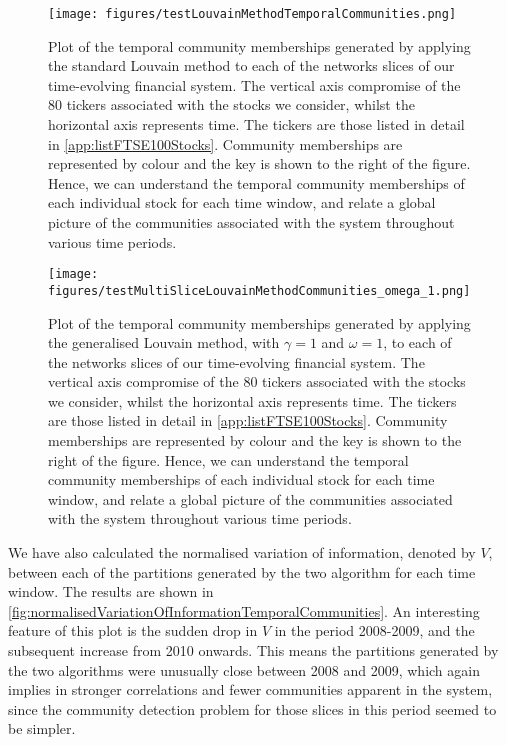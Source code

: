 \begin{figure}
	\centering
	\texttt{[image: figures/testLouvainMethodTemporalCommunities.png]}
	\caption[Plot of the temporal community memberships generated by applying the standard Louvain method to each of the networks slices of our time-evolving financial system.]{\label{fig:standardLouvainMethodTemporalCommunities} Plot of the temporal community memberships generated by applying the standard Louvain method to each of the networks slices of our time-evolving financial system. The vertical axis compromise of the 80 tickers associated with the stocks we consider, whilst the horizontal axis represents time. The tickers are those listed in detail in \cref{app:listFTSE100Stocks}. Community memberships are represented by colour and the key is shown to the right of the figure. Hence, we can understand the temporal community memberships of each individual stock for each time window, and relate a global picture of the communities associated with the system throughout various time periods.}
\end{figure}

\begin{figure}
	\centering
	\texttt{[image: figures/testMultiSliceLouvainMethodCommunities\_omega\_1.png]}
	\caption[Plot of the temporal community memberships generated by applying the generalised Louvain method to each of the networks slices of our time-evolving financial system.]{\label{fig:generalisedLouvainMethodTemporalCommunities} Plot of the temporal community memberships generated by applying the generalised Louvain method, with $\gamma = 1$ and $\omega=1$, to each of the networks slices of our time-evolving financial system. The vertical axis compromise of the 80 tickers associated with the stocks we consider, whilst the horizontal axis represents time. The tickers are those listed in detail in \cref{app:listFTSE100Stocks}. Community memberships are represented by colour and the key is shown to the right of the figure. Hence, we can understand the temporal community memberships of each individual stock for each time window, and relate a global picture of the communities associated with the system throughout various time periods.}
\end{figure}

We have also calculated the normalised variation of information, denoted by $V$, between each of the partitions generated by the two algorithm for each time window.
The results are shown in \cref{fig:normalisedVariationOfInformationTemporalCommunities}.
An interesting feature of this plot is the sudden drop in $V$ in the period 2008-2009, and the subsequent increase from 2010 onwards.
This means the partitions generated by the two algorithms were unusually close between 2008 and 2009, which again implies in stronger correlations and fewer communities apparent in the system, since the community detection problem for those slices in this period seemed to be simpler.

